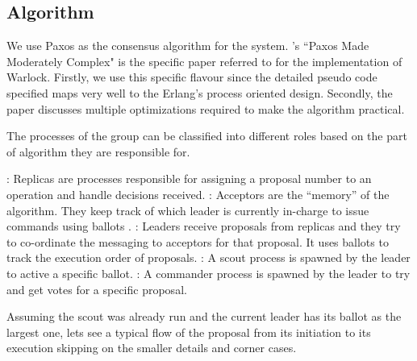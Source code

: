 \subsection{Algorithm}

We use Paxos  as the consensus algorithm for the system.
\citet{Robbert2011}'s ``Paxos Made Moderately Complex" is the specific paper
referred to for the implementation of
Warlock. Firstly, we use this specific flavour since the detailed pseudo code
specified maps very well to the Erlang's process oriented%
 design. Secondly, the paper discusses multiple optimizations required to make
the algorithm practical.

The processes of the group can be classified into different roles based on the
part of algorithm they are responsible for.

\begin{itemize}
    : Replicas are processes responsible for assigning a proposal
    number to an operation and handle decisions received.
    : Acceptors are the ``memory'' of the algorithm. They keep
    track of which leader is currently in-charge to issue commands using
    ballots%
    .
    : Leaders receive proposals from replicas and they try to
    co-ordinate the messaging to acceptors for that proposal. It uses ballots
    to track the execution order of proposals.
    : A scout process is spawned by the leader to active a specific
    ballot.
    : A commander process is spawned by the leader to try
    and get votes for a specific proposal.
\end{itemize}

Assuming the scout was already run and the current leader has its ballot as the
largest one, lets see a typical flow of the proposal from its initiation to its
execution skipping on the smaller details and corner cases.

